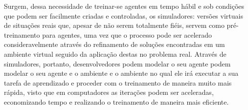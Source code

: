\documentclass[cic,tc]{iiufrgs}
\begin{document}
    
    Surgem, dessa necessidade de treinar-se agentes em tempo hábil e sob condições que podem ser facilmente criadas e controladas, os simuladores: versões
    virtuais de situações reais que, apesar de não serem totalmente fiéis, servem como pré-treinamento para agentes, uma vez que o processo pode ser
    acelerado consideravelmente através do refinamento de soluções encontradas em um ambiente virtual seguido da aplicação destas no problema real. Através
    de simuladores, portanto, desenvolvedores podem modelar o seu agente podem modelar o seu agente e o ambiente e o ambiente no qual ele irá executar
    a sua tarefa de aprendizado e proceder com o treinamento de maneira muito mais rápida, visto que em computadores as iterações podem ser aceleradas,
    economizando tempo e realizando o treinamento de maneira mais eficiente.
    
\end{document}
